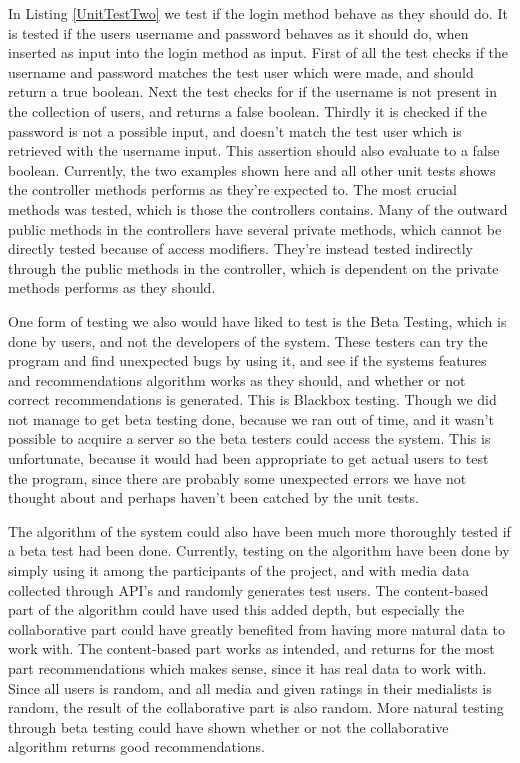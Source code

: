 In Listing \ref{UnitTestTwo} we test if the login method behave as they should do. It is tested if the users username and password behaves as it should do, when inserted as input into the login method as input. First of all the test checks if the username and password matches the test user which were made, and should return a true boolean. Next the test checks for if the username is not present in the collection of users, and returns a false boolean. Thirdly it is checked if the password is not a possible input, and doesn’t match the test user which is retrieved with the username input. This assertion should also evaluate to a false boolean. Currently, the two examples shown here and all other unit tests shows the controller methods performs as they’re expected to. The most crucial methods was tested, which is those the controllers contains. Many of the outward public methods in the controllers have several private methods, which cannot be directly tested because of access modifiers. They’re instead tested indirectly through the public methods in the controller, which is dependent on the private methods performs as they should.

One form of testing we also would have liked to test is the Beta Testing, which is done by users, and not the developers of the system. These testers can try the program and find unexpected bugs by using it, and see if the systems features and recommendations algorithm works as they should, and whether or not correct recommendations is generated. This is Blackbox testing. Though we did not manage to get beta testing done, because we ran out of time, and it wasn’t possible to acquire a server so the beta testers could access the system. This is unfortunate, because it would had been appropriate to get actual users to test the program, since there are probably some unexpected errors we have not thought about and perhaps haven’t been catched by the unit tests.

The algorithm of the system could also have been much more thoroughly tested if a beta test had been done. Currently, testing on the algorithm have been done by simply using it among the participants of the project, and with media data collected through API’s and randomly generates test users. The content-based part of the algorithm could have used this added depth, but especially the collaborative part could have greatly benefited from having more natural data to work with. The content-based part works as intended, and returns for the most part recommendations which makes sense, since it has real data to work with. Since all users is random, and all media and given ratings in their medialists is random, the result of the collaborative part is also random. More natural testing through beta testing could have shown whether or not the collaborative algorithm returns good recommendations.
